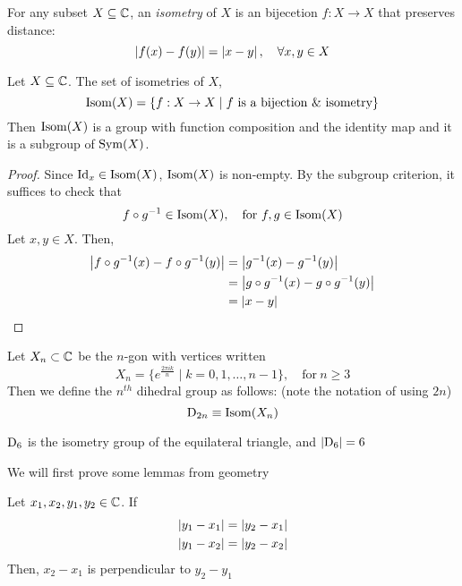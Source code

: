 \documentclass{article}
\begin{document}
\begin{defi}[Isometry]
    For any subset $X \subseteq \mathbb{C}$, an \emph{isometry} of $X$ is an bijecetion $f: X \rightarrow X$ that preserves distance:
    \[
        \left\lvert f(x) - f(y)\right\rvert = \left\lvert x - y\right\rvert, \quad \forall x, y \in X
    \]
\end{defi}

\begin{prop}
    Let $X \subseteq \mathbb{C}$. The set of isometries of $X$,
    \[
        \Isom(X) = \{f: X \rightarrow X \mid f \ \text{is a bijection \& isometry}\}
    \]
    Then $\operatorname{Isom}(X)$ is a group with function composition and the identity map and it is a subgroup of $\operatorname{Sym}(X)$.
\end{prop}

\begin{proof}
    Since $\mathrm{Id}_x \in \operatorname{Isom}(X)$, $\operatorname{Isom}(X)$ is non-empty. By the subgroup criterion, it suffices to check that
    \[
        f \circ g^{-1} \in \Isom(X), \quad \text{for} \ f, g \in \Isom(X)   
    \]
    Let $x, y \in X$. Then,
    \begin{align*}
        \left\lvert f \circ g^{-1}(x) - f \circ g^{-1}(y)\right\rvert &= \left\lvert g^{-1}(x) - g^{-1}(y)\right\rvert \\
        &= \left\lvert g \circ g^{-1}(x) - g \circ g^{-1}(y)\right\rvert \\
        & = \left\lvert x - y\right\rvert
    \end{align*}
\end{proof}

\begin{defi}
    Let $X_n \subset \mathbb{C}$ be the $n$-gon with vertices written
    \[
        X_n = \{e^\frac{2\pi i k}{n} \mid k = 0, 1, \ldots, n-1 \}, \quad \text{for} \ n\geq 3
    \]
    Then we define the $n^{th}$ dihedral group as follows: (note the notation of using $2n$)
    \[
        \mathrm{D}_{2n} \equiv \operatorname{Isom}(X_n)
    \]
\end{defi}

\begin{eg}
    $\mathrm{D}_6$ is the isometry group of the equilateral triangle, and $\left\lvert \mathrm{D}_6\right\rvert = 6$ 
\end{eg}

\begin{thm}[$\abs{\D_{2n}} = 2n$]
\end{thm}

We will first prove some lemmas from geometry

\begin{lemma}
    Let $x_1, x_2, y_1, y_2 \in \mathbb{C}$. If
    \begin{align*}
        \left\lvert y_1 - x_1\right\rvert &= \left\lvert y_2 - x_1\right\rvert \\
        \left\lvert y_1 - x_2\right\rvert &= \left\lvert y_2 - x_2\right\rvert
    \end{align*}
    Then, $x_2 - x_1$ is perpendicular to $y_2 - y_1$
\end{lemma}
\end{document}
